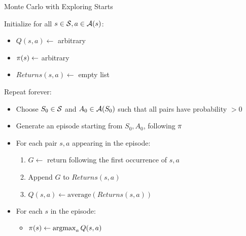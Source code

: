 
\begin{algorithm}
\caption{Monte Carlo with Exploring Starts}
\label{alg:mces}

Initialize for all $s \in \mathcal{S}, a \in \mathcal{A}(s)$:
\begin{itemize}[noitemsep]
	\item $Q(s,a) \gets$ arbitrary
	\item $\pi(s) \gets$ arbitrary
	\item $\textit{Returns}(s,a) \gets$ empty list
\end{itemize}


Repeat forever:
\begin{itemize}[noitemsep]
	\item Choose $S_0 \in \mathcal{S}$ and $A_0 \in \mathcal{A}(S_0)$
		such that all pairs have probability $> 0$
	\item Generate an episode starting from $S_0,A_0$, following $\pi$
	\item For each pair $s,a$ appearing in the episode:
		\begin{enumerate}[noitemsep]
		\item $G \gets$ return following the first occurrence of $s,a$
		\item Append $G$ to $\textit{Returns}(s,a)$
		\item $Q(s,a) \gets \text{average}(\textit{Returns}(s,a))$
		\end{enumerate}
	\item For each $s$ in the episode:
		\begin{itemize}[noitemsep]
			\item $\pi(s) \gets \operatorname*{argmax}_a Q(s,a)$
		\end{itemize}
\end{itemize}

\end{algorithm}
